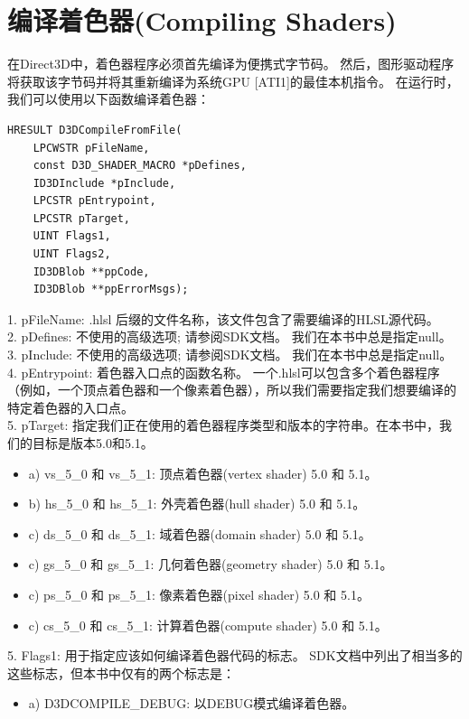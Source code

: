 \documentclass[11pt,a4paper,oldfontcommands]{memoir}
\begin{document}
{\section{编译着色器(Compiling Shaders)}
\begin{flushleft}
在Direct3D中，着色器程序必须首先编译为便携式字节码。 然后，图形驱动程序将获取该字节码并将其重新编译为系统GPU [ATI1]的最佳本机指令。 在运行时，我们可以使用以下函数编译着色器：\\
\begin{lstlisting}
HRESULT D3DCompileFromFile(
    LPCWSTR pFileName,
    const D3D_SHADER_MACRO *pDefines,
    ID3DInclude *pInclude,
    LPCSTR pEntrypoint,
    LPCSTR pTarget,
    UINT Flags1,
    UINT Flags2,
    ID3DBlob **ppCode,
    ID3DBlob **ppErrorMsgs);
\end{lstlisting}
1. pFileName: .hlsl 后缀的文件名称，该文件包含了需要编译的HLSL源代码。\\
2. pDefines: 不使用的高级选项; 请参阅SDK文档。 我们在本书中总是指定null。\\
3. pInclude: 不使用的高级选项; 请参阅SDK文档。 我们在本书中总是指定null。\\
4. pEntrypoint: 着色器入口点的函数名称。 一个.hlsl可以包含多个着色器程序（例如，一个顶点着色器和一个像素着色器），所以我们需要指定我们想要编译的特定着色器的入口点。\\
5. pTarget: 指定我们正在使用的着色器程序类型和版本的字符串。在本书中，我们的目标是版本5.0和5.1。\\
\begin{itemize}
  \item a) vs\_5\_0 和 vs\_5\_1: 顶点着色器(vertex shader) 5.0 和 5.1。
  \item b) hs\_5\_0 和 hs\_5\_1: 外壳着色器(hull shader) 5.0 和 5.1。
  \item c) ds\_5\_0 和 ds\_5\_1: 域着色器(domain shader) 5.0 和 5.1。
  \item c) gs\_5\_0 和 gs\_5\_1: 几何着色器(geometry shader) 5.0 和 5.1。
  \item c) ps\_5\_0 和 ps\_5\_1: 像素着色器(pixel shader) 5.0 和 5.1。
  \item c) cs\_5\_0 和 cs\_5\_1: 计算着色器(compute shader) 5.0 和 5.1。
\end{itemize}
5. Flags1: 用于指定应该如何编译着色器代码的标志。 SDK文档中列出了相当多的这些标志，但本书中仅有的两个标志是：\\
\begin{itemize}
  \item a) D3DCOMPILE\_DEBUG: 以DEBUG模式编译着色器。

\end{itemize}
\end{flushleft}}
\end{document}
